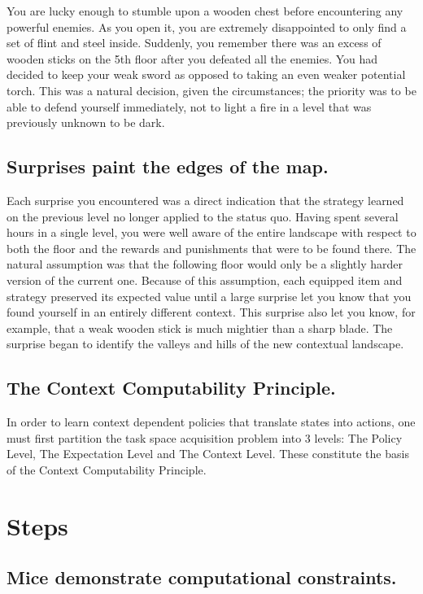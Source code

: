 \documentclass[]{article}
\begin{document}
You are lucky enough to stumble upon a wooden chest before encountering any powerful enemies.  As you open it, you are extremely disappointed to only find a set of flint and steel inside.  Suddenly, you remember there was an excess of wooden sticks on the 5th floor after you defeated all the enemies.  You had decided to keep your weak sword as opposed to taking an even weaker potential torch.  This was a natural decision, given the circumstances; the priority was to be able to defend yourself immediately, not to light a fire in a level that was previously unknown to be dark.

\subsection{Surprises paint the edges of the map.}

Each surprise you encountered was a direct indication that the strategy learned on the previous level no longer applied to the status quo.  Having spent several hours in a single level, you were well aware of the entire landscape with respect to both the floor and the rewards and punishments that were to be found there.  The natural assumption was that the following floor would only be a slightly harder version of the current one.  Because of this assumption, each equipped item and strategy preserved its expected value until a large surprise let you know that you found yourself in an entirely different context.  This surprise also let you know, for example, that a weak wooden stick is much mightier than a sharp blade.  The surprise began to identify the valleys and hills of the new contextual landscape.

\subsection{The Context Computability Principle.}
In order to learn context dependent policies that translate states into actions, one must first partition the task space acquisition problem into 3 levels: The Policy Level, The Expectation Level and The Context Level.  These constitute the basis of the Context Computability Principle.


\section{Steps}

\subsection{Mice demonstrate computational constraints.}
\end{document}
